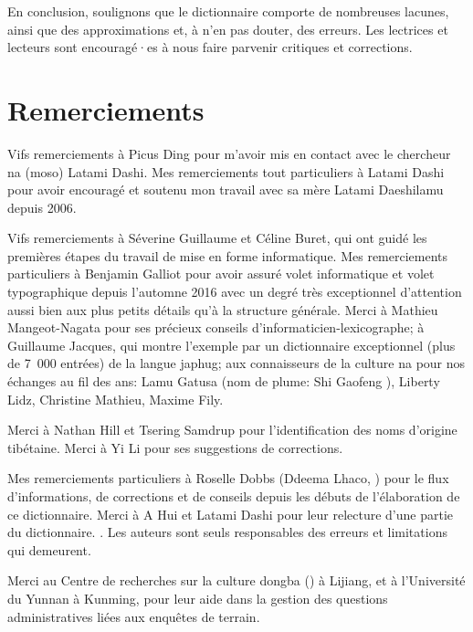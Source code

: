 En conclusion, soulignons que le dictionnaire comporte de nombreuses lacunes, ainsi que des approximations et, à n'en pas douter, des erreurs. Les lectrices et lecteurs sont encouragé·es à nous faire parvenir critiques et corrections.


\section{Remerciements}

Vifs remerciements à Picus Ding pour m’avoir mis en contact avec le chercheur na (moso) Latami Dashi. Mes remerciements tout particuliers à Latami Dashi  pour avoir encouragé et soutenu mon travail avec sa mère Latami Daeshilamu  depuis 2006.

Vifs remerciements à Séverine Guillaume et Céline Buret, qui ont guidé les premières étapes du travail de mise en forme informatique. Mes remerciements particuliers à Benjamin Galliot pour avoir assuré volet informatique et volet typographique depuis l'automne 2016 avec un degré très exceptionnel d'attention aussi bien aux plus petits détails qu'à la structure générale. Merci à Mathieu Mangeot-Nagata pour ses précieux conseils d’informaticien-lexicographe; à Guillaume Jacques, qui montre l’exemple par un dictionnaire exceptionnel (plus de 7~000 entrées) de la langue japhug; aux connaisseurs de la culture na pour nos échanges au fil des ans: Lamu Gatusa  (nom de plume: Shi Gaofeng ), Liberty Lidz, Christine Mathieu, Maxime Fily.

Merci à Nathan Hill et Tsering Samdrup pour l'identification des noms d'origine tibétaine. Merci à Yi Li  pour ses suggestions de corrections.

Mes remerciements particuliers à Roselle Dobbs (Ddeema Lhaco, ) pour le flux d’informations, de corrections et de conseils depuis les débuts de l’élaboration de ce dictionnaire. Merci à A Hui  et Latami Dashi  pour leur relecture d’une partie du dictionnaire.  \parencite[vi]{yliniemi_descriptive_2022}. Les auteurs sont seuls responsables des erreurs et limitations qui demeurent.

Merci au Centre de recherches sur la culture dongba () à Lijiang, et à l’Université du Yunnan à Kunming, pour leur aide dans la gestion des questions administratives liées aux enquêtes de terrain.


